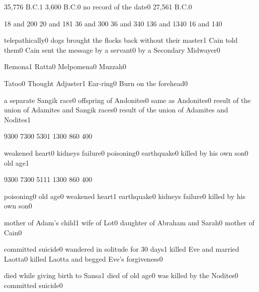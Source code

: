 {35,776 B.C.}{1}
{3,600 B.C.}{0}
{no record of the date}{0}
{27,561 B.C.}{0}
\qstop

{18 and 20}{0}
{20 and 18}{1}
{36 and 30}{0}
{36 and 34}{0}
{136 and 134}{0}
{16 and 14}{0}
\qstop

{telepathically}{0}
{dogs brought the flocks back without their master}{1}
{Cain told them}{0}
{Cain sent the message by a servant}{0}
{by a Secondary Midwayer}{0}
\qstop

{Remona}{1}
{Ratta}{0}
{Melpomena}{0}
{Muzzah}{0}
\qstop

{Tatoo}{0}
{Thought Adjuster}{1}
{Ear-ring}{0}
{Burn on the forehead}{0}
\qstop

{a separate Sangik race}{0}
{offspring of Andonites}{0}
{same as Andonites}{0}
{result of the union of Adamites and Sangik races}{0}
{result of the union of Adamites and Nodites}{1}
\qstop

{930}{0}
{730}{0}
{530}{1}
{130}{0}
{86}{0}
{40}{0}
\qstop

{weakened heart}{0}
{kidneys failure}{0}
{poisoning}{0}
{earthquake}{0}
{killed by his own son}{0}
{old age}{1}
\qstop

{930}{0}
{730}{0}
{511}{1}
{130}{0}
{86}{0}
{40}{0}
\qstop

{poisoning}{0}
{old age}{0}
{weakened heart}{1}
{earthquake}{0}
{kidneys failure}{0}
{killed by his own son}{0}
\qstop

{mother of Adam's child}{1}
{wife of Lot}{0}
{daughter of Abraham and Sarah}{0}
{mother of Cain}{0}
\qstop

{committed suicide}{0}
{wandered in solitude for 30 days}{1}
{killed Eve and married Laotta}{0}
{killed Laotta and begged Eve's forgiveness}{0}
\qstop


{died while giving birth to Sansa}{1}
{died of old age}{0}
{was killed by the Nodites}{0}
{committed suicide}{0}
\qstop


